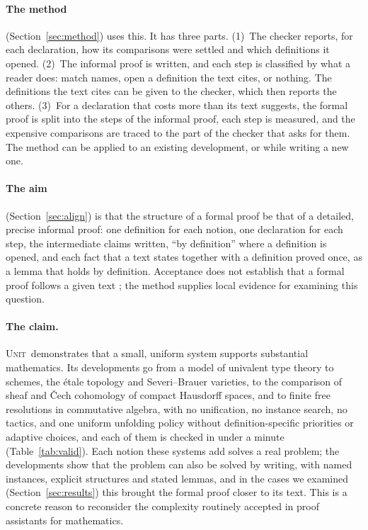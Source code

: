 \documentclass[11pt]{article}
\newcommand{\sys}{\textsc{Unit}}
\begin{document}
\paragraph{The method} (Section~\ref{sec:method}) uses this. It has
three parts.
(1)~The checker reports, for each declaration, how its comparisons were
settled and which definitions it opened. (2)~The informal proof is
written, and each step is classified by what a reader does: match
names, open a definition the text cites, or nothing. The definitions the
text cites can be given to the checker, which then reports the others.
(3)~For a declaration that costs more than its text suggests, the formal
proof is split into the steps of the informal proof, each step is
measured, and the expensive comparisons are traced to the part of the
checker that asks for them. The method can be applied to an existing
development, or while writing a new one.

\paragraph{The aim} (Section~\ref{sec:align}) is that the structure of a
formal proof be that of a detailed, precise informal proof: one
definition for each notion, one declaration for each step, the
intermediate claims written, ``by definition'' where a definition is
opened, and each fact that a text states together with a definition
proved once, as a lemma that holds by definition. Acceptance does not establish that a formal proof follows
a given text \cite{BCH}; the method supplies local evidence for
examining this question.

\paragraph{The claim.} \sys\ demonstrates that a small, uniform system
supports substantial mathematics. Its developments go from a model of univalent type theory to
schemes, the \'etale topology and Severi--Brauer varieties, to the comparison of sheaf and \v{C}ech
cohomology of compact Hausdorff spaces, and to finite free resolutions
in commutative algebra, with no unification, no instance
search, no tactics, and one uniform unfolding policy without
definition-specific priorities or adaptive choices, and each of them is
checked in under a minute (Table~\ref{tab:valid}). Each notion these
systems add solves a real problem; the developments show that the
problem can also be solved by writing, with named instances, explicit
structures and stated lemmas, and in the cases we examined
(Section~\ref{sec:results}) this brought the formal proof closer to its
text. This is a concrete reason to reconsider the complexity routinely
accepted in proof assistants for mathematics.
\end{document}
